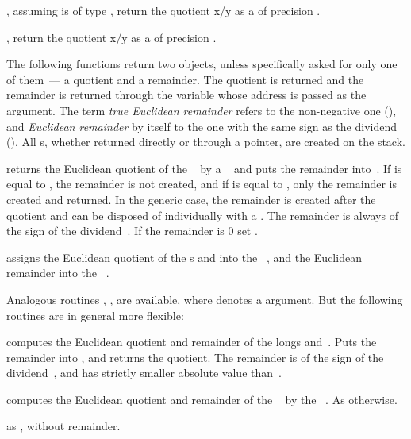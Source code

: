 , assuming 
is of type , return the quotient x/y as a  of
precision .

, return the quotient x/y as a
 of precision .


 The following functions return two objects,
unless specifically asked for only one of them~--- a quotient and a remainder.
The quotient is returned and the remainder is returned through the variable
whose address is passed as the  argument. The term \emph{true
Euclidean remainder} refers to the non-negative one (), and
\emph{Euclidean remainder} by itself to the one with the same sign as the
dividend (). All s, whether returned directly or through a
pointer, are created on the stack.

 returns the Euclidean quotient of the
~ by a ~ and puts the remainder
into~. If  is equal to , the remainder is not
created, and if  is equal to  , only the remainder is
created and returned. In the generic case, the remainder is created after the
quotient and can be disposed of individually with a . The
remainder is always of the sign of the dividend~. If the remainder
is $0$ set .

 assigns the Euclidean
quotient of the s  and  into the ~,
and the Euclidean remainder into the ~.

\noindent Analogous routines \kbd{[z]}, \kbd{[z]},
\kbd{[z]} are available, where  denotes a 
argument. But the following routines are in general more flexible:

 computes the Euclidean
quotient and remainder of the longs  and~. Puts the remainder
into , and returns the quotient. The remainder is of the sign of the
dividend~, and has strictly smaller absolute value than~.

 computes the Euclidean
quotient and remainder of the ~ by the ~. As
 otherwise.

 as , without
remainder.

